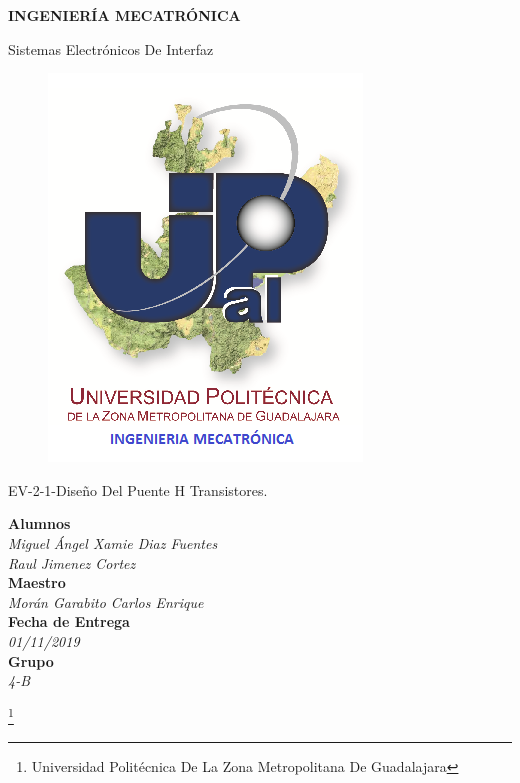 \documentclass[10pt,a4paper]{article}
\author{Miguel Ángel Xamie Diaz Fuentes/Jimenez Cortes Raúl}
\begin{document}
\begin{center}
\begin{LARGE}
\textbf{INGENIERÍA MECATRÓNICA}\\
\end{LARGE}
{\large Sistemas Electrónicos De Interfaz}\\
\begin{figure}[hbtp]
\centering
\includegraphics[scale=0.80]{UPZMG_Mecatr_nica.png}
\end{figure} 
\begin{center}
\begin{LARGE}
EV-2-1-Diseño Del Puente H Transistores.
\end{LARGE}
\end{center}

\begin{Large}
\textbf{Alumnos}
\\\textit{Miguel Ángel Xamie Diaz Fuentes\\Raul Jimenez Cortez}
\textbf{\\Maestro}
\\\textit{Morán Garabito Carlos Enrique}
\textbf{\\Fecha de Entrega}
\\\textit{01/11/2019}
\textbf{\\Grupo}
\\\textit{4-B}
\end{Large}

\end{center}

\footnote{Universidad Politécnica De La Zona Metropolitana De Guadalajara} 
\end{document}
